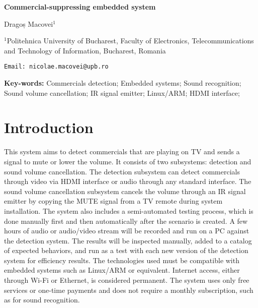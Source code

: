 \documentclass[12pt, twoside]{article}
\begin{document}
	\begin{center}
	\begin{huge}
	
	\textbf{Commercial-suppressing embedded system}
	\end{huge}
	
	\begin{large}
		Dragoș Macovei$^1$
	\end{large}
	
	
	\small {$^1$Politehnica University of Bucharest, Faculty of Electronics, Telecommunications and Technology of Information, Bucharest, Romania}\newline
	
	\texttt {Email: nicolae.macovei@upb.ro}\newline
	
	\textbf{Key-words:} Commercials detection; Embedded systems; Sound recognition; Sound volume cancellation; IR signal emitter; Linux/ARM; HDMI interface;


	\end{center}

\section{Introduction}

This system aims to detect commercials that are playing on TV and sends a signal to mute or lower the volume. It consists of two subsystems: detection and sound volume cancellation. The detection subsystem can detect commercials through video via HDMI interface or audio through any standard interface. The sound volume cancellation subsystem cancels the volume through an IR signal emitter by copying the MUTE signal from a TV remote during system installation. The system also includes a semi-automated testing process, which is done manually first and then automatically after the scenario is created. A few hours of audio or audio/video stream will be recorded and run on a PC against the detection system. The results will be inspected manually, added to a catalog of expected behaviors, and run as a test with each new version of the detection system for efficiency results. The technologies used must be compatible with embedded systems such as Linux/ARM or equivalent. Internet access, either through Wi-Fi or Ethernet, is considered permanent. The system uses only free services or one-time payments and does not require a monthly subscription, such as for sound recognition.
\end{document}
